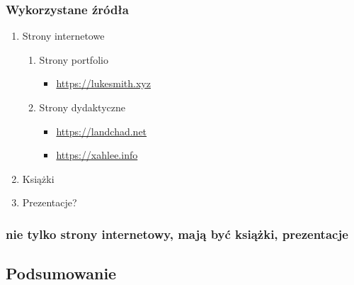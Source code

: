 \documentclass[11pt]{article}
\begin{document}
\subsubsection{Wykorzystane źródła}
\label{sec:org3ce5cd6}
\begin{enumerate}
\item Strony internetowe
\label{sec:orgca59240}
\begin{enumerate}
\item Strony portfolio
\label{sec:org2e02209}
\begin{itemize}
\item \url{https://lukesmith.xyz}
\end{itemize}
\item Strony dydaktyczne
\label{sec:org1238f6b}
\begin{itemize}
\item \url{https://landchad.net}
\item \url{https://xahlee.info}
\end{itemize}
\end{enumerate}
\item Książki
\label{sec:org9376193}
\item Prezentacje?
\label{sec:orgbb5254d}
\end{enumerate}
\subsubsection{nie tylko strony internetowy, mają być książki, prezentacje}
\label{sec:orgc08315a}
\subsection{Podsumowanie}
\label{sec:orgcc9e2fb}
\end{document}
